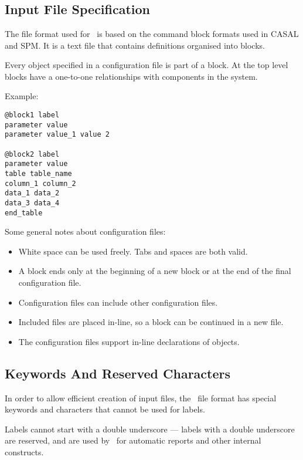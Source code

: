 
\section{\label{sec:examples}}

\subsection{Input File Specification}

The file format used for \CNAME\ is based on the command block formats used in CASAL and SPM. It is a text file that contains definitions organised into blocks.

Every object specified in a configuration file is part of a block. At the top level blocks have a one-to-one relationships with components in the system.

Example:

{\small{\begin{verbatim}
@block1 label
parameter value
parameter value_1 value 2

@block2 label
parameter value
table table_name
column_1 column_2
data_1 data_2
data_3 data_4
end_table
\end{verbatim}}}

Some general notes about configuration files:

\begin{itemize}
	\item White space can be used freely. Tabs and spaces are both valid.
	\item A block ends only at the beginning of a new block or at the end of the final configuration file.
	\item Configuration files can include other configuration files.
	\item Included files are placed in-line, so a block can be continued in a new file.
	\item The configuration files support in-line declarations of objects.
\end{itemize}

\subsection{Keywords And Reserved Characters}

In order to allow efficient creation of input files, the \CNAME\ file format has special keywords and characters that cannot be used for labels.

Labels cannot start with a double underscore --- labels with a double underscore are reserved, and are used by \CNAME\ for automatic reports and other internal constructs.

